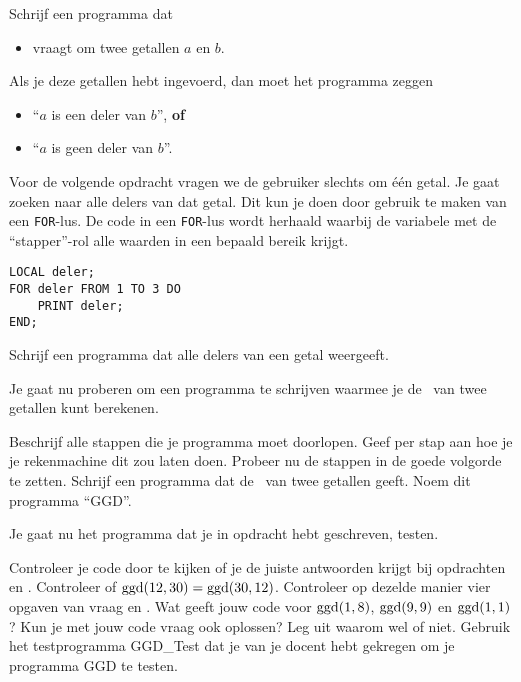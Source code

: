 \opdracht[2]  Schrijf een programma dat 
		\begin{itemize}
			\item vraagt om twee getallen $a$ en $b$.
		\end{itemize}
		Als je deze getallen hebt ingevoerd, dan moet het programma zeggen
		\begin{itemize}
			\item ``$a$ is een deler van $b$'', \textbf{of}
			\item ``$a$ is geen deler van $b$''.
		\end{itemize}

Voor de volgende opdracht vragen we de gebruiker slechts om \'e\'en getal.
Je gaat zoeken naar alle delers van dat getal.
Dit kun je doen door gebruik te maken van een \lstinline!FOR!-lus.
De code in een \lstinline!FOR!-lus wordt herhaald waarbij de variabele met de ``stapper''-rol alle waarden in een bepaald bereik krijgt.

\begin{lstlisting}[float=h, caption={FOR-lus}, label={lst:for}]
LOCAL deler;
FOR deler FROM 1 TO 3 DO
	PRINT deler;
END;
\end{lstlisting}

\opdracht[2] Schrijf een programma dat alle delers van een getal weergeeft.

\opdracht[3] \label{ggdopdr}%
Je gaat nu proberen om een programma te schrijven waarmee je de \ggd\ van  twee getallen kunt berekenen. 

\? Beschrijf alle stappen die je programma moet doorlopen.
\? Geef per stap aan hoe je je rekenmachine dit zou laten doen.
\? Probeer nu de stappen in de goede volgorde te zetten.
\? Schrijf een programma dat de \ggd\ van twee getallen geeft. Noem dit programma ``GGD''. \label{ggdopdreind}

\opdracht[3] Je gaat nu het programma dat je in opdracht  hebt geschreven, testen.

\? Controleer je code door te kijken of je de juiste antwoorden krijgt bij opdrachten  en .
\? Controleer of $\operatorname{ggd}(12,30)=\operatorname{ggd}(30,12)$. Controleer op dezelde manier vier opgaven van vraag  en .
\? Wat geeft jouw code voor $\operatorname{ggd}(1,8)$, $\operatorname{ggd}(9,9)$ en $\operatorname{ggd}(1,1)$?
\? Kun je met jouw code vraag  ook oplossen? Leg uit waarom wel of niet.
\? Gebruik het testprogramma GGD\_Test dat je van je docent hebt gekregen om je programma GGD te testen. 

